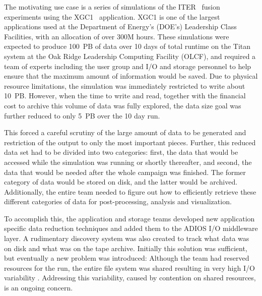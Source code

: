 The motivating use case is a series of simulations of the
ITER~\cite{dietz1996iter} fusion experiments using the
XGC1~\cite{chang2006integrated} application. XGC1 is one of the largest
applications used at the Department of Energy's (DOE's) Leadership Class
Facilities, with an allocation of over 300M hours. 
These simulations were expected to produce 100~PB of data over 10 days of
total runtime on the Titan system at the Oak Ridge Leadership Computing
Facility (OLCF), and required a team of experts including
the user group and I/O and storage personnel to help ensure that the maximum
amount of information would be saved. Due to physical resource limitations,
the simulation was immediately restricted to write about 10~PB. However,
when the time to write and read, together with the financial cost to archive
this volume of data was fully explored, the data size goal was further
reduced to only 5~PB over the 10 day run. 

This forced a careful scrutiny of the large amount of data to be generated
and restriction of the output to only the most important pieces. Further,
this reduced data set had to be divided into two categories: first, the data
that would be accessed while the simulation was running or shortly
thereafter, and second, the data that would be needed after the whole
campaign was finished. The former category of data would be stored on disk,
and the latter would be archived. Additionally, the entire team needed to
figure out how to efficiently retrieve these different categories of data
for post-processing, analysis and visualization.

To accomplish this, the application and storage teams developed new
application specific data reduction techniques and added them to the ADIOS
I/O middleware layer. A rudimentary discovery system was also created to
track what data was on disk and what was on the tape archive. Initially this
solution was sufficient, but eventually a new problem was introduced:
Although the team had reserved resources for the run, the entire file system
was shared \cite{shipman2012next} resulting in very high I/O variability
\cite{lofstead:2010:io-variability,liu_hotstorage}. Addressing this variability, caused by
contention on shared resources, is an ongoing concern. 

